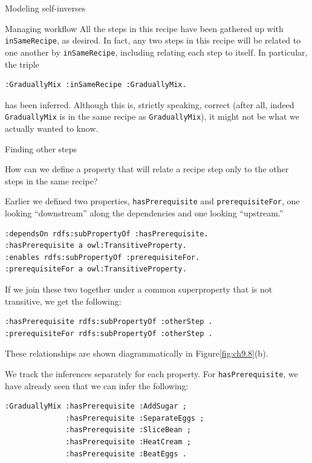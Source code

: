 \begin{challenge}{Modeling self-inverses}
\begin{challenge}{Managing workflow}
All the steps in this recipe have been gathered up with \texttt{inSameRecipe}, as
desired. In fact, any two steps in this recipe will be related to one
another by \texttt{inSameRecipe}, including relating each step to itself. In
particular, the triple

\begin{lstlisting}
:GraduallyMix :inSameRecipe :GraduallyMix.
\end{lstlisting}

has been inferred. Although this is, strictly speaking, correct (after
all, indeed \texttt{GraduallyMix} is in the same recipe as \texttt{GraduallyMix}), it
might not be what we actually wanted to know.
\end{challenge}


\begin{challenge}{Finding other steps}

How can we define a property that will relate a recipe step only to the
other steps in the same recipe?

\solution

Earlier we defined two properties, \texttt{hasPrerequisite} and \texttt{prerequisiteFor},
one looking ``downstream'' along the dependencies and one looking
``upstream.''

\begin{lstlisting}
:dependsOn rdfs:subPropertyOf :hasPrerequisite.
:hasPrerequisite a owl:TransitiveProperty.
:enables rdfs:subPropertyOf :prerequisiteFor.
:prerequisiteFor a owl:TransitiveProperty.
\end{lstlisting}

If we join these two together under a common superproperty that is not
transitive, we get the following:

\begin{lstlisting}
:hasPrerequisite rdfs:subPropertyOf :otherStep .
:prerequisiteFor rdfs:subPropertyOf :otherStep .
\end{lstlisting}

These relationships are shown diagrammatically in Figure\ref{fig:ch9.8}(b).

We track the inferences separately for each property. For
\texttt{hasPrerequisite}, we have already seen that we can infer the following:

\begin{lstlisting}
:GraduallyMix :hasPrerequisite :AddSugar ;
              :hasPrerequisite :SeparateEggs ;
              :hasPrerequisite :SliceBean ;
              :hasPrerequisite :HeatCream ;
              :hasPrerequisite :BeatEggs .
\end{lstlisting}


\end{challenge}
\end{challenge}
